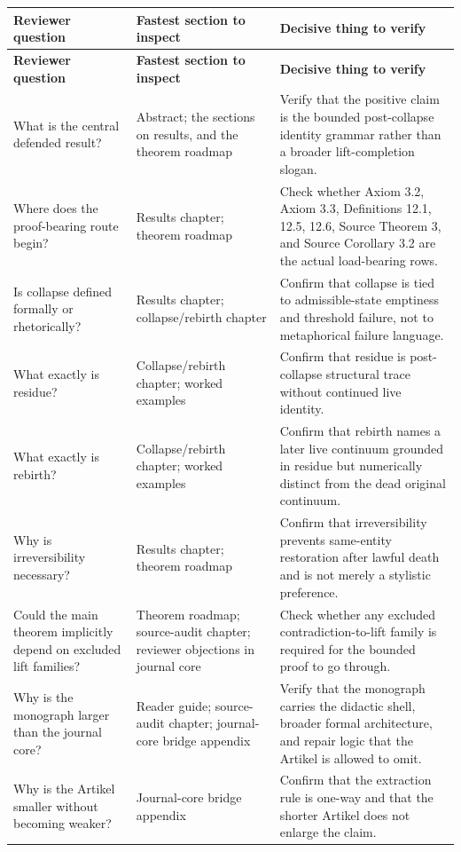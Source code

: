 \begin{longtable}{p{3.4cm} p{4.4cm} p{5.7cm}}
\toprule
\textbf{Reviewer question} & \textbf{Fastest section to inspect} & \textbf{Decisive thing to verify} \\
\midrule
\endfirsthead
\toprule
\textbf{Reviewer question} & \textbf{Fastest section to inspect} & \textbf{Decisive thing to verify} \\
\midrule
\endhead
\bottomrule
\endfoot
What is the central defended result? & Abstract; the sections on results, and the theorem roadmap & Verify that the positive claim is the bounded post-collapse identity grammar rather than a broader lift-completion slogan. \\
Where does the proof-bearing route begin? & Results chapter; theorem roadmap & Check whether Axiom 3.2, Axiom 3.3, Definitions 12.1, 12.5, 12.6, Source Theorem 3, and Source Corollary 3.2 are the actual load-bearing rows. \\
Is collapse defined formally or rhetorically? & Results chapter; collapse/rebirth chapter & Confirm that collapse is tied to admissible-state emptiness and threshold failure, not to metaphorical failure language. \\
What exactly is residue? & Collapse/rebirth chapter; worked examples & Confirm that residue is post-collapse structural trace without continued live identity. \\
What exactly is rebirth? & Collapse/rebirth chapter; worked examples & Confirm that rebirth names a later live continuum grounded in residue but numerically distinct from the dead original continuum. \\
Why is irreversibility necessary? & Results chapter; theorem roadmap & Confirm that irreversibility prevents same-entity restoration after lawful death and is not merely a stylistic preference. \\
Could the main theorem implicitly depend on excluded lift families? & Theorem roadmap; source-audit chapter; reviewer objections in journal core & Check whether any excluded contradiction-to-lift family is required for the bounded proof to go through. \\
Why is the monograph larger than the journal core? & Reader guide; source-audit chapter; journal-core bridge appendix & Verify that the monograph carries the didactic shell, broader formal architecture, and repair logic that the Artikel is allowed to omit. \\
Why is the Artikel smaller without becoming weaker? & Journal-core bridge appendix & Confirm that the extraction rule is one-way and that the shorter Artikel does not enlarge the claim. \\

\end{longtable}
